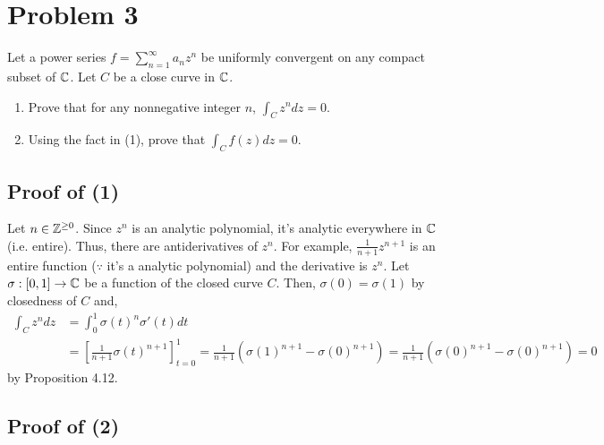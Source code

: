 \section*{Problem 3}

Let a power series \(f = \sum_{n=1}^{\infty} a_n z^n\) be uniformly convergent on any compact subset of \(\mathbb{C}\). Let \(C\) be a close curve in \(\mathbb{C}\).
\begin{enumerate}[label=(\arabic*)]
\item Prove that for any nonnegative integer \(n\), \(\int_{C} z^n dz = 0\).
\item Using the fact in (1), prove that \(\int_C f(z) dz = 0\).
\end{enumerate}

\subsection*{Proof of (1)}

Let \(n \in \mathbb{Z}^{\ge 0}\).
Since \(z^n\) is an analytic polynomial, it's analytic everywhere in \(\mathbb{C}\) (i.e. entire).
Thus, there are antiderivatives of \(z^n\).
For example, \(\frac{1}{n + 1}z^{n + 1}\) is an entire function (\(\because\) it's a analytic polynomial) and the derivative is \(z^n\).
Let \(\sigma: [0, 1] \to \mathbb{C}\) be a function of the closed curve \(C\).
Then, \(\sigma(0) = \sigma(1)\) by closedness of \(C\) and,
\begin{align*}
\int_C z^n dz
&= \int_{0}^{1} \sigma(t)^n \sigma'(t) dt
\\&= \left[ \frac{1}{n + 1} \sigma(t)^{n + 1} \right]_{t=0}^{1}
= \frac{1}{n + 1} (\sigma(1)^{n + 1} - \sigma(0)^{n + 1})
= \frac{1}{n + 1} (\sigma(0)^{n + 1} - \sigma(0)^{n + 1})
= 0
\end{align*}
by Proposition 4.12.
\qedsq

\subsection*{Proof of (2)}

